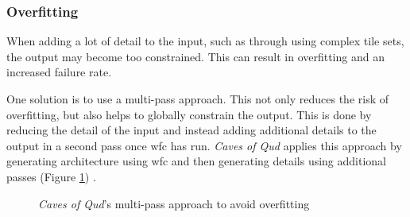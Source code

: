 \subsubsection{Overfitting}
When adding a lot of detail to the input, such as through using complex tile sets, the output may become too constrained. This can result in overfitting and an increased failure rate.

One solution is to use a multi-pass approach. This not only reduces the risk of overfitting, but also helps to globally constrain the output. This is done by reducing the detail of the input and instead adding additional details to the output in a second pass once \acrshort{wfc} has run. \textit{Caves of Qud} applies this approach by generating architecture using \acrshort{wfc} and then generating details using additional passes (Figure \ref{fig:cavesOfQudWFCOverfitting}) \cite{GDC_caves_of_qud}.

\begin{figure}[H]
    \centering
    \hfill
    \caption{\textit{Caves of Qud}'s multi-pass approach to avoid overfitting \cite{GDC_caves_of_qud}}
    \label{fig:cavesOfQudWFCOverfitting}
\end{figure}

